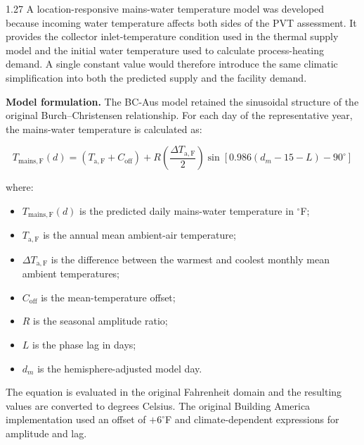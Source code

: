 \documentclass[12pt,letterpaper]{article}
\begin{document}
\begin{spacing}{1.27}
A location-responsive mains-water temperature model was developed because incoming water temperature affects both sides of the PVT assessment. It provides the collector inlet-temperature condition used in the thermal supply model and the initial water temperature used to calculate process-heating demand. A single constant value would therefore introduce the same climatic simplification into both the predicted supply and the facility demand.\par

\vspace{0.15in}

\textbf{Model formulation.} The BC-Aus model retained the sinusoidal structure of the original Burch--Christensen relationship. For each day of the representative year, the mains-water temperature is calculated as:

\begin{equation}
T_{\mathrm{mains,F}}(d) = \left(T_{\mathrm{a,F}} + C_{\mathrm{off}}\right) + R\left(\frac{\Delta T_{\mathrm{a,F}}}{2}\right)\sin\left[0.986\left(d_m - 15 - L\right) - 90^\circ\right]
\label{eq:bcaus}
\end{equation}

\noindent where:
\begin{itemize}
  \item $T_{\mathrm{mains,F}}(d)$ is the predicted daily mains-water temperature in $^\circ$F;
  \item $T_{\mathrm{a,F}}$ is the annual mean ambient-air temperature;
  \item $\Delta T_{\mathrm{a,F}}$ is the difference between the warmest and coolest monthly mean ambient temperatures;
  \item $C_{\mathrm{off}}$ is the mean-temperature offset;
  \item $R$ is the seasonal amplitude ratio;
  \item $L$ is the phase lag in days;
  \item $d_m$ is the hemisphere-adjusted model day.
\end{itemize}

The equation is evaluated in the original Fahrenheit domain and the resulting values are converted to degrees Celsius. The original Building America implementation used an offset of $+6^\circ$F and climate-dependent expressions for amplitude and lag.\par

\vspace{0.15in}


\end{spacing}
\end{document}
